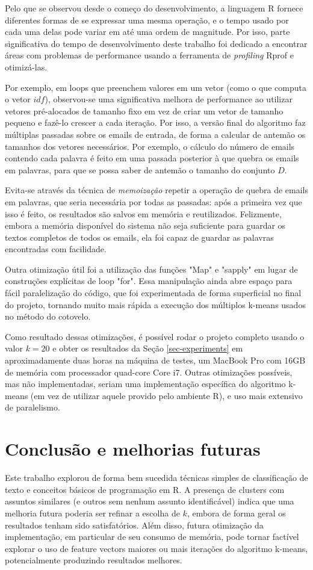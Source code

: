\documentclass[10pt,twocolumn,letterpaper]{article}
\begin{document}
Pelo que se observou desde o começo do desenvolvimento, a linguagem R fornece diferentes formas de se expressar uma mesma operação, e o tempo usado por cada uma delas pode variar em até uma ordem de magnitude. Por isso, parte significativa do tempo de desenvolvimento deste trabalho foi dedicado a encontrar áreas com problemas de performance usando a ferramenta de \emph{profiling} Rprof e otimizá-las.

Por exemplo, em loops que preenchem valores em um vetor (como o que computa o vetor $idf$), observou-se uma significativa melhora de performance ao utilizar vetores pré-alocados de tamanho fixo em vez de criar um vetor de tamanho pequeno e fazê-lo crescer a cada iteração. Por isso, a versão final do algoritmo faz múltiplas passadas sobre os emails de entrada, de forma a calcular de antemão os tamanhos dos vetores necessários. Por exemplo, o cálculo do número de emails contendo cada palavra é feito em uma passada posterior à que quebra os emails em palavras, para que se possa saber de antemão o tamanho do conjunto $D$.

Evita-se através da técnica de \emph{memoização} repetir a operação de quebra de emails em palavras, que seria necessária por todas as passadas: após a primeira vez que isso é feito, os resultados são salvos em memória e reutilizados. Felizmente, embora a memória disponível do sistema não seja suficiente para guardar os textos completos de todos os emails, ela foi capaz de guardar as palavras encontradas com facilidade.

Outra otimização útil foi a utilização das funções "Map" e "sapply" em lugar de construções explícitas de loop "for". Essa manipulação ainda abre espaço para fácil paralelização do código, que foi experimentada de forma superficial no final do projeto, tornando muito mais rápida a execução dos múltiplos k-means usados no método do cotovelo.

Como resultado dessas otimizações, é possível rodar o projeto completo usando o valor $k = 20$ e obter os resultados da Seção \ref{sec-experiments} em aproximadamente duas horas na máquina de testes, um MacBook Pro com 16GB de memória com processador quad-core Core i7. Outras otimizações possíveis, mas não implementadas, seriam uma implementação específica do algoritmo k-means (em vez de utilizar aquele provido pelo ambiente R), e uso mais extensivo de paralelismo.

\section{Conclusão e melhorias futuras}
Este trabalho explorou de forma bem sucedida técnicas simples de classificação de texto e conceitos básicos de programação em R. A presença de clusters com assuntos similares (e outros sem nenhum assunto identificável) indica que uma melhoria futura poderia ser refinar a escolha de $k$, embora de forma geral os resultados tenham sido satisfatórios. Além disso, futura otimização da implementação, em particular de seu consumo de memória, pode tornar factível explorar o uso de feature vectors maiores ou mais iterações do algoritmo k-means, potencialmente produzindo resultados melhores.

{\small


}
\end{document}
